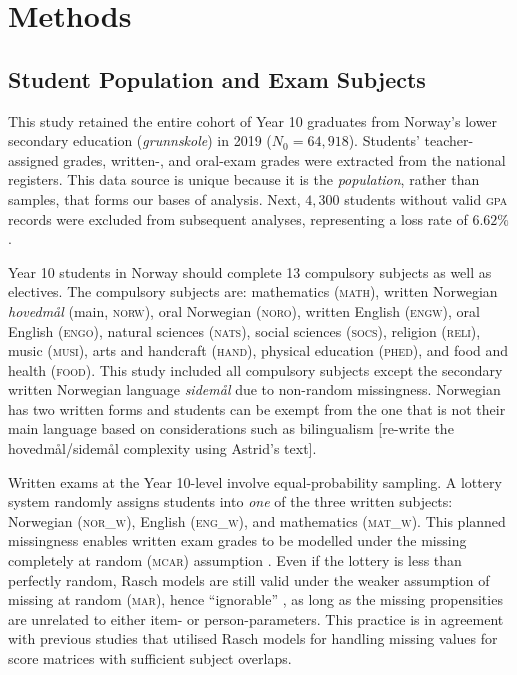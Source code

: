 \newpage
\section{Methods}

\subsection{Student Population and Exam Subjects}

This study retained the entire cohort of Year 10 graduates from Norway's lower secondary education (\textit{grunnskole}) in 2019 ($N_0 = 64,918$). Students' teacher-assigned grades, written-, and oral-exam grades were extracted from the national registers. This data source is unique because it is the \emph{population}, rather than samples, that forms our bases of analysis. Next, $4,300$ students without valid \textsc{gpa} records were excluded from subsequent analyses, representing a loss rate of $6.62\%$.

Year 10 students in Norway should complete 13 compulsory subjects as well as electives. The compulsory subjects are: mathematics (\textsc{math}), written Norwegian \textit{hovedm{\aa}l} (main, \textsc{norw}), oral Norwegian (\textsc{noro}), written English (\textsc{engw}), oral English (\textsc{engo}), natural sciences (\textsc{nats}), social sciences (\textsc{socs}), religion (\textsc{reli}), music (\textsc{musi}), arts and handcraft (\textsc{hand}), physical education (\textsc{phed}), and food and health (\textsc{food}). This study included all compulsory subjects except the secondary written Norwegian language \textit{sidem{\aa}l} due to non-random missingness. Norwegian has two written forms and students can be exempt from the one that is not their main language based on considerations such as bilingualism [re-write the hovedm{\aa}l/sidem{\aa}l complexity using Astrid's text].

Written exams at the Year 10-level involve equal-probability sampling. A lottery system randomly assigns students into \emph{one} of the three written subjects: Norwegian (\textsc{nor\_w}),  English (\textsc{eng\_w}), and mathematics (\textsc{mat\_w}). This planned missingness enables written exam grades to be modelled under the missing completely at random (\textsc{mcar}) assumption \parencite{little:2019}. Even if the lottery is less than perfectly random, Rasch models are still valid under the weaker assumption of missing at random (\textsc{mar}), hence ``ignorable'' \parencite{molenaar:1995}, as long as the missing propensities are unrelated to either item- or person-parameters. This practice is in agreement with previous studies \parencite[e.g., ][]{he:2018} that utilised Rasch models for handling missing values for score matrices with sufficient subject overlaps.

